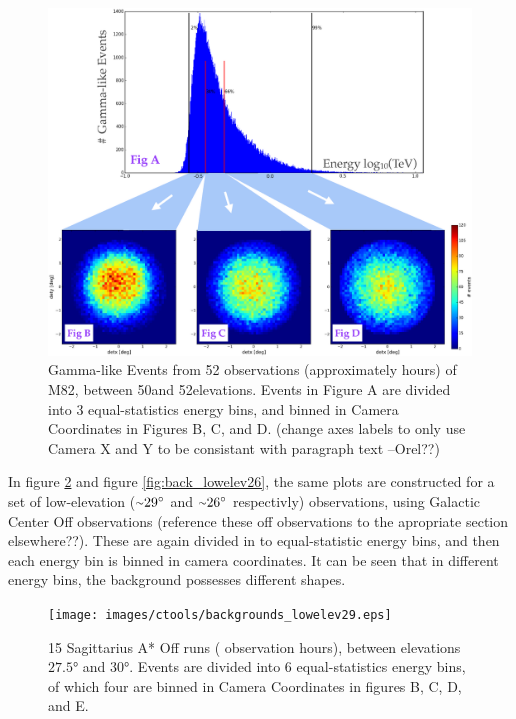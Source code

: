     \begin{figure}[ht]
      \begin{center}
        \includegraphics[width=\textwidth]{images/ctools/backgrounds_highelev.eps}
        \caption[FITS Background at 50\degree Elevation]{Gamma-like Events from 52 observations (approximately  hours) of M82, between 50\degree  and 52\degree  elevations.  Events in Figure A are divided into 3 equal-statistics energy bins, and binned in Camera Coordinates in Figures B, C, and D. (change axes labels to only use Camera X and Y to be consistant with paragraph text --Orel??)}\label{fig:back_highelev}
      \end{center}
    \end{figure}

    In figure \ref{fig:back_lowelev29} and figure \ref{fig:back_lowelev26}, the same plots are constructed for a set of low-elevation ($ \nicetilde \ang{29} $ and $ \nicetilde \ang{26} $ respectivly) observations, using Galactic Center Off observations (reference these off observations to the apropriate section elsewhere??).
    These are again divided in to equal-statistic energy bins, and then each energy bin is binned in camera coordinates.
    It can be seen that in different energy bins, the background possesses different shapes.

    \begin{figure}[ht]
      \begin{center}
        \texttt{[image: images/ctools/backgrounds\_lowelev29.eps]}
        \caption[CTOOLS Background at 29\degree Elevation]{15 Sagittarius A* Off runs ( observation hours), between elevations $ \ang{27.5} $ and $ \ang{30} $.  Events are divided into 6 equal-statistics energy bins, of which four are binned in Camera Coordinates in figures B, C, D, and E.}\label{fig:back_lowelev29}
      \end{center}
    \end{figure}

